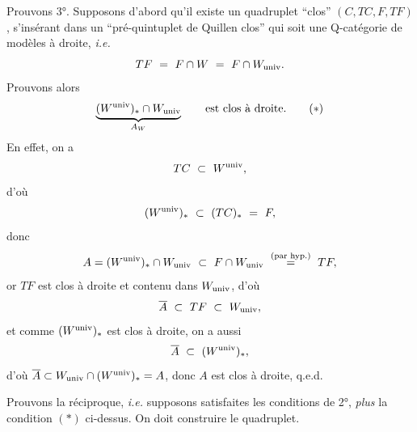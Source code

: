 Prouvons 3°. Supposons d'abord qu'il existe un quadruplet “clos” $(C, TC, F, TF)$, s'insérant dans un “pré-quintuplet de Quillen clos” qui soit une Q-catégorie de modèles à droite, \textit{i.e.}
\[ TF \ =\ F \cap W \ =\ F \cap W_{\mathrm{univ}}. \]
Prouvons alors
\[ \underbrace{(W^{\mathrm{univ}})_* \cap W_{\mathrm{univ}}}_{A_W} \qquad \text{est clos à droite.} \tag*{$(*)$} \]
En effet, on a
\[ TC \ \subset\ W^{\univ}, \]
d'où
\[ (W^{\mathrm{univ}})_* \ \subset\ (TC)_* \ =\ F, \]
donc
\[ A = (W^{\univ})_* \cap W_{\univ} \ \subset\ F \cap W_{\univ} \ \overset{\text{(par hyp.)}}{=}\ TF, \]
or $TF$ est clos à droite et contenu dans $W_{\mathrm{univ}}$, d'où
\[ \overline{A} \ \subset\ TF \ \subset\ W_{\univ}, \]
et comme $(W^{\mathrm{univ}})_*$ est clos à droite, on a aussi
\[ \overline{A} \ \subset\ (W^{\univ})_*, \]
d'où $\overline{A} \subset W_{\mathrm{univ}} \cap (W^{\mathrm{univ}})_* = A$, donc $A$ est clos à droite, q.e.d.

Prouvons la réciproque, \textit{i.e.} supposons satisfaites les conditions de 2°, \textit{plus} la condition $(*)$ ci-dessus. On doit construire le quadruplet.


